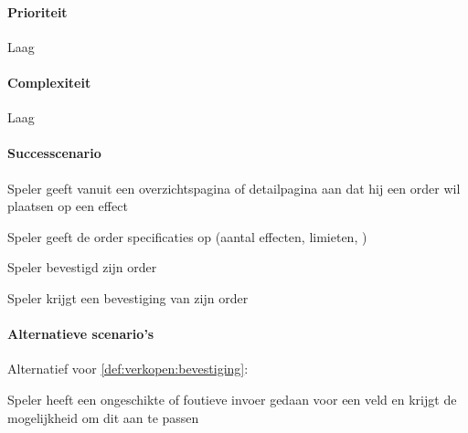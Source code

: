 \begin{compact}
\paragraph{Prioriteit}Laag
\paragraph{Complexiteit}Laag
\paragraph{Successcenario}
\begin{enumerate_compact}
 \item Speler geeft vanuit een overzichtspagina of detailpagina aan dat hij een order wil plaatsen op een effect
 \item Speler geeft de order specificaties op (aantal effecten, limieten, )
 \item Speler bevestigd zijn order
 \item \label{def:verkopen:bevestiging} Speler krijgt een bevestiging van zijn order
\end{enumerate_compact}
\paragraph{Alternatieve scenario's}
Alternatief voor \ref{def:verkopen:bevestiging}:
\begin{enumerate_compact}
 \item Speler heeft een ongeschikte of foutieve invoer gedaan voor een veld en krijgt de mogelijkheid om dit aan te passen
\end{enumerate_compact}
\end{compact}

